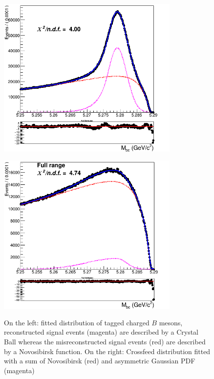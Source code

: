 \begin{figure}[H]
\begin{minipage}{.5\textwidth}
\centering
\subcaptionbox{\label{fig:stream0_chargedBtagFit_400bins_fixed_old_parameters_freeSigmaCB_and_misRecoPdf}}
{\includegraphics[width=0.80\textwidth]{05-chargedControlSample/figs/stream0_chargedBtagFit_400bins_fixed_old_parameters_freeSigmaCB_and_misRecoPdf.png}}
\end{minipage} 
 \begin{minipage}{.5\textwidth}
\subcaptionbox{\label{fig:NeutralCrossfeed_stream0_ControlD0_chargedBtag_MbcFit}}
{\includegraphics[width=0.80\textwidth]{05-chargedControlSample/figs/NeutralCrossfeed_stream0_ControlD0_chargedBtag_MbcFit.png}}
\end{minipage}
\caption{On the left: fitted distribution of tagged charged $B$ mesons, reconstructed signal events (magenta) are described by a Crystal Ball whereas the misreconstructed signal events (red) are described by a Novosibirsk function. On the right: Crossfeed distribution fitted with a sum of Novosibirsk (red) and asymmetric Gaussian PDF (magenta)}
\end{figure}


